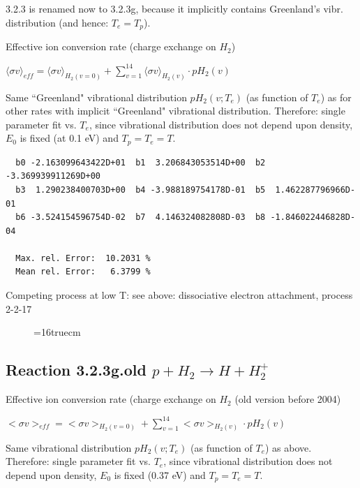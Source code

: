 \documentclass[12pt,dvipdfmx]{article}
\begin{document}

  3.2.3 is renamed now to 3.2.3g, because it
  implicitly contains Greenland's vibr. distribution (and hence: $T_e=T_p$).

  Effective ion conversion rate (charge exchange on $H_2$)

  $ \langle\sigma v \rangle_{eff} = \langle\sigma v \rangle_{H_2(v=0)} + \sum_{v=1}^{14}
\langle\sigma v \rangle_{H_2(v)} \cdot pH_2(v) $

  Same ``Greenland" vibrational distribution  $pH_2(v;T_e)$ (as function of $T_e$) as for other rates with
  implicit ``Greenland" vibrational distribution.
  Therefore: single parameter fit vs. $T_e$,
  since vibrational distribution does not depend upon density, $E_0$ is fixed
  (at 0.1 eV) and $T_p = T_e = T$.

\begin{small}\begin{verbatim}
  b0 -2.163099643422D+01  b1  3.206843053514D+00  b2 -3.369939911269D+00
  b3  1.290238400703D+00  b4 -3.988189754178D-01  b5  1.462287796966D-01
  b6 -3.524154596754D-02  b7  4.146324082808D-03  b8 -1.846022446828D-04

  Max. rel. Error:  10.2031 %
  Mean rel. Error:   6.3799 %

\end{verbatim}\end{small}
Competing process at low T: see above: dissociative electron attachment, process 2-2-17
\begin{figure} \label{3.2.3g}
\epsfxsize=16truecm
\end{figure}

\newpage

\subsection{
Reaction 3.2.3g.old   $p + H_2 \rightarrow H + H_2^+  $}

  Effective ion conversion rate (charge exchange on $H_2$ (old version before 2004)

  $ <\sigma v>_{eff} = <\sigma v>_{H_2(v=0)} + \sum_{v=1}^{14}
<\sigma v>_{H_2(v)} \cdot pH_2(v) $

  Same vibrational distribution $pH_2(v;T_e)$ (as function of $T_e$) as above.
  Therefore:
  single parameter fit vs. $T_e$,
  since vibrational distribution does not depend upon density, $E_0$ is fixed
  (0.37 eV) and $T_p = T_e = T$.
\end{document}
